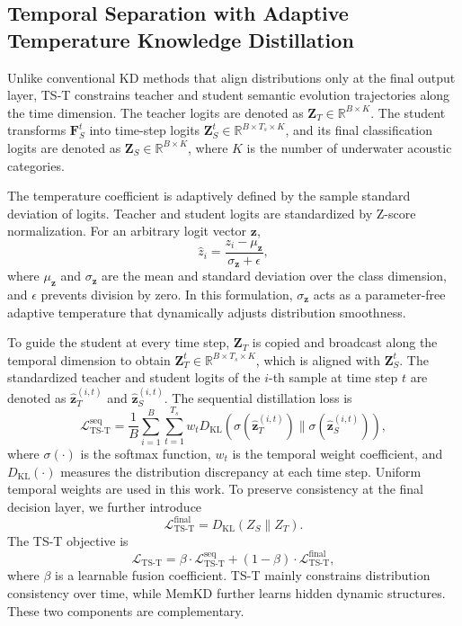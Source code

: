 ﻿\documentclass[lettersize,journal]{IEEEtran}
\begin{document}
\subsection{Temporal Separation with Adaptive Temperature Knowledge Distillation}
\label{subsec:tser}
Unlike conventional KD methods that align distributions only at the final output layer, TS-T constrains teacher and student semantic evolution trajectories along the time dimension. The teacher logits are denoted as $\mathbf{Z}_{T} \in \mathbb{R}^{B\times K}$. The student transforms $\mathbf{F}_S^t$ into time-step logits $\mathbf{Z}^{t}_S \in \mathbb{R}^{B \times T_s \times K}$, and its final classification logits are denoted as $\mathbf{Z}_S \in \mathbb{R}^{B \times K}$, where $K$ is the number of underwater acoustic categories.

The temperature coefficient is adaptively defined by the sample standard deviation of logits. Teacher and student logits are standardized by Z-score normalization. For an arbitrary logit vector $\mathbf{z}$,
\begin{equation}
\hat{z}_i = \frac{z_i - \mu_\mathbf{z}}{\sigma_\mathbf{z} + \epsilon},
\end{equation}
where $\mu_\mathbf{z}$ and $\sigma_\mathbf{z}$ are the mean and standard deviation over the class dimension, and $\epsilon$ prevents division by zero. In this formulation, $\sigma_\mathbf{z}$ acts as a parameter-free adaptive temperature that dynamically adjusts distribution smoothness.

To guide the student at every time step, $\mathbf{Z}_{T}$ is copied and broadcast along the temporal dimension to obtain $\mathbf{Z}_{T}^{t} \in \mathbb{R}^{B \times T_s \times K}$, which is aligned with $\mathbf{Z}_S^{t}$. The standardized teacher and student logits of the $i$-th sample at time step $t$ are denoted as $\hat{\mathbf{z}}_T^{(i,t)}$ and $\hat{\mathbf{z}}_S^{(i,t)}$. The sequential distillation loss is
\begin{equation}
\mathcal{L}_{\mathrm{TS\mbox{-}T}}^{\mathrm{seq}}
=
\frac{1}{B}
\sum_{i=1}^{B}
\sum_{t=1}^{T_s}
w_t
D_{\mathrm{KL}}
\left(
\sigma(\hat{\mathbf{z}}_{T}^{(i,t)})
\|
\sigma(\hat{\mathbf{z}}_{S}^{(i,t)})
\right),
\end{equation}
where $\sigma(\cdot)$ is the softmax function, $w_t$ is the temporal weight coefficient, and $D_{\mathrm{KL}}(\cdot)$ measures the distribution discrepancy at each time step. Uniform temporal weights are used in this work. To preserve consistency at the final decision layer, we further introduce
\begin{equation}
    \mathcal{L}_{\mathrm{TS\mbox{-}T}}^{\mathrm{final}}
    = D_{\mathrm{KL}}(Z_S \| Z_T).
\end{equation}
The TS-T objective is
\begin{equation}
\mathcal{L}_{\mathrm{TS\mbox{-}T}}
=
\beta \cdot \mathcal{L}_{\mathrm{TS\mbox{-}T}}^{\mathrm{seq}}
+
(1 - \beta)\cdot
\mathcal{L}_{\mathrm{TS\mbox{-}T}}^{\mathrm{final}},
\end{equation}
where $\beta$ is a learnable fusion coefficient. TS-T mainly constrains distribution consistency over time, while MemKD further learns hidden dynamic structures. These two components are complementary.
\end{document}
